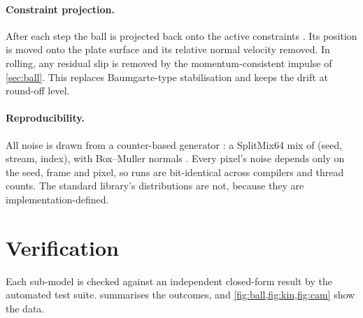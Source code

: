 \documentclass[10pt,a4paper]{article}
\begin{document}
\paragraph{Constraint projection.} After each step the ball is projected back onto the active
constraints \citep{hairer2006geometric}. Its position is moved onto the plate surface and its
relative normal velocity removed. In rolling, any residual slip is removed by the
momentum-consistent impulse of \cref{sec:ball}. This replaces Baumgarte-type stabilisation
\citep{baumgarte1972stabilization} and keeps the drift at round-off level.

\paragraph{Reproducibility.} All noise is drawn from a counter-based generator
\citep{salmon2011parallel}: a SplitMix64 mix \citep{steele2014fast} of (seed, stream, index),
with Box--Muller normals \citep{box1958note}. Every pixel's noise depends only on the seed, frame
and pixel, so runs are bit-identical across compilers and thread counts. The standard library's
distributions are not, because they are implementation-defined.

\section{Verification}\label{sec:verification}
Each sub-model is checked against an independent closed-form result by the automated test
suite.  summarises the outcomes, and \cref{fig:ball,fig:kin,fig:cam} show
the data.
\end{document}
